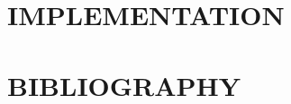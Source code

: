 \section{IMPLEMENTATION}




\clearpage
\section{BIBLIOGRAPHY}
\printbibliography[heading=none]

\clearpage
\renewcommand{\listfigurename}{LIST OF FIGURES}
\listoffigures

\clearpage
\renewcommand{\listtablename}{LIST OF TABLES}
\listoftables

\clearpage


